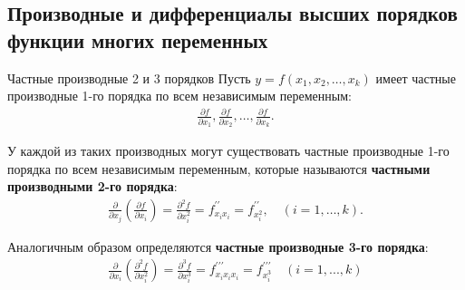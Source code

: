 \subsection{Производные и дифференциалы высших порядков функции многих переменных} \label{sec:2.5}

\begin{tbox}{Частные производные 2 и 3 порядков}
	Пусть $y = f(x_1, x_2, \dots, x_k)$ имеет частные производные 1-го порядка по всем независимым переменным:
	\begin{align} \label{eq:2.5.1}
		\frac{\partial f}{\partial x_1}, \frac{\partial f}{\partial x_2}, \dots, \frac{\partial f}{\partial x_k}.
	\end{align}

	У каждой из таких производных могут существовать частные производные 1-го порядка по всем независимым переменным, которые называются \textbf{частными производными 2-го порядка}:
	\begin{align} \label{eq:2.5.2}
		\frac{\partial}{\partial x_j} \left( \frac{\partial f}{\partial x_i} \right) = \frac{\partial^2 f}{\partial x_i^2} = f^{\prime\prime}_{x_i x_i} = f^{\prime\prime}_{x_i^2}, \quad (i = 1, \dots, k).
	\end{align}

	Аналогичным образом определяются \textbf{частные производные 3-го порядка}:
	\begin{align}\label{eq:2.5.3}
		\frac{\partial}{\partial x_i} \left( \frac{\partial^2 f}{\partial x_i^2} \right) = \frac{\partial^3 f}{\partial x_i^3} = f^{\prime\prime\prime}_{x_i x_i x_i} = f^{\prime\prime\prime}_{x_i^3} \quad (i = 1,...,k)
	\end{align}
\end{tbox}

